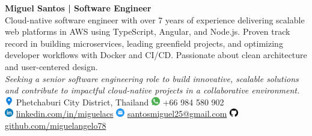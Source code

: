 \documentclass[11pt,a4paper]{moderncv}
\title{} %
\begin{document}
\vspace*{-2em}
\noindent
\begin{minipage}[t]{0.13\textwidth}
\end{minipage}%
\hspace{2em}%
\begin{minipage}[c]{0.80\textwidth}
  \raggedright
  \textbf{\LARGE Miguel Santos | Software Engineer}\\[0.3em]
  Cloud-native software engineer with over 7 years of experience delivering scalable web platforms in AWS using TypeScript, Angular, and Node.js. Proven track record in building microservices, leading greenfield projects, and optimizing developer workflows with Docker and CI/CD. Passionate about clean architecture and user-centered design.\\[0.3em]

  {\footnotesize
    \textit{Seeking a senior software engineering role to build innovative, scalable solutions and contribute to impactful cloud-native projects in a collaborative environment.}
  }\\[0.8em]
  {\footnotesize
    \includegraphics[height=1em]{images/icon-location.png}
    Phetchaburi City District, Thailand 
    \hspace{0.8em}
    {\includegraphics[height=1em]{images/icon-whatsapp.png}}
    +66 984 580 902 \\[0.3em]

    {\includegraphics[height=1em]{images/icon-linkedin.png}}
    \href{https://linkedin.com/in/miguelacs}{linkedin.com/in/miguelacs}
    \hspace{0.8em}
    {\includegraphics[height=1em]{images/icon-email.png}}
    \href{mailto:santosmiguel25@gmail.com}{santosmiguel25@gmail.com}
    \hspace{0.8em}
    {\includegraphics[height=1em]{images/icon-github.png}}
    \href{https://github.com/miguelangelo78}{github.com/miguelangelo78}
  }
\end{minipage}
\end{document}
